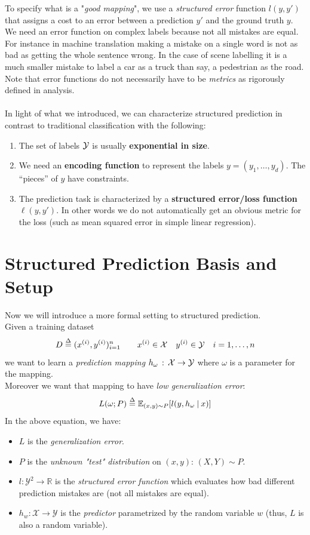 \noindent To specify what is a "\textit{good mapping}", we use a
\textit{structured error} function $l(y, y')$ that assigns a cost to an error
between a prediction $y'$ and the ground truth $y$. We need an error function
on complex labels because not all mistakes are equal.  For instance in machine
translation making a mistake on a single word is not as
bad as getting the whole sentence wrong. In the case of scene labelling it is a
much smaller mistake to label a car as a truck than say, a pedestrian as the
road. Note that error functions do not necessarily have to be \emph{metrics}
as rigorously defined in analysis.
\\
\\
In light of what we introduced, we can characterize structured prediction in
contrast to traditional classification with the following:
\begin{enumerate}
\item The set of labels $\mathcal{Y}$ is usually \textbf{exponential in size}.
\item We need an \textbf{encoding function} to
    represent the labels $y=(y_1,\ldots,y_d)$. The ``pieces'' of $y$ have
    constraints.
\item The prediction task is characterized by a \textbf{structured error/loss
    function} $\ell(y,y')$. In other words we do not automatically get
    an obvious metric for the loss (such as mean squared error in simple
    linear regression).
\end{enumerate}

\section{Structured Prediction Basis and Setup}
Now we will introduce a more formal setting to structured prediction. \\ Given
a training dataset
\begin{equation}
    D \mathrel{\stackrel{\Delta}{=}} (x^{(i)}, y^{(i)})_{i=1}^n \qquad x^{(i)} \in \mathcal{X} \quad y^{(i)} \in \mathcal{Y} \quad i=1,\ldots,n
\end{equation}
we want to learn a \emph{prediction mapping} 
$h_\omega \, : \, \mathcal{X} \rightarrow \mathcal{Y}$ where $\omega$ is a parameter for the
mapping.\\
Moreover we want that mapping to have \emph{low generalization error}:
\begin{equation}
    L(\omega;P) \mathrel{\stackrel{\Delta}{=}} \mathbb{E}_{(x,y) \sim P} [ l(y, h_\omega \:\vert\: x)]
    \label{eq:vrisk}
\end{equation}
In the above equation, we have:
\begin{itemize}
\item $L$ is the \textit{generalization error}. 
\item $P$ is the \textit{ unknown "test" distribution} on $(x,y)$: $(X, Y) \sim P$.
\item $l: \mathcal{Y}^2 \rightarrow \mathbb{R}$ is the \textit{structured error
    function} which evaluates how bad different prediction mistakes are (not
    all mistakes are equal).
\item $h_w: \mathcal{X} \rightarrow \mathcal{Y}$ is the \textit{predictor}
    parametrized by the random variable $w$ (thus, $L$ is also a random
    variable).
\end{itemize}

